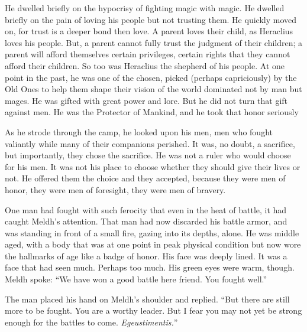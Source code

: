 He dwelled briefly on the hypocrisy of fighting magic with magic. He dwelled briefly on the pain of loving his people but not trusting them. He quickly moved on, for trust is a deeper bond then love. A parent loves their child, as Heraclius loves his people. But, a parent cannot fully trust the judgment of their children; a parent will afford themselves certain privileges, certain rights that they cannot afford their children. So too was Heraclius the shepherd of his people. At one point in the past, he was one of the chosen, picked (perhaps capriciously) by the Old Ones to help them shape their vision of the world dominated not by man but mages. He was gifted with great power and lore. But he did not turn that gift against men. He was the Protector of Mankind, and he took that honor seriously

As he strode through the camp, he looked upon his men, men who fought valiantly while many of their companions perished. It was, no doubt, a sacrifice, but importantly, they chose the sacrifice. He was not a ruler who would choose for his men. It was not his place to choose whether they should give their lives or not. He offered them the choice and they accepted, because they were men of honor, they were men of foresight, they were men of bravery.

One man had fought with such ferocity that even in the heat of battle, it had caught Meldh’s attention. That man had now discarded his battle armor, and was standing in front of a small fire, gazing into its depths, alone. He was middle aged, with a body that was at one point in peak physical condition but now wore the hallmarks of age like a badge of honor. His face was deeply lined. It was a face that had seen much. Perhaps too much. His green eyes were warm, though. Meldh spoke: “We have won a good battle here friend. You fought well.”

The man placed his hand on Meldh’s shoulder and replied. “But there are still more to be fought. You are a worthy leader. But I fear you may not yet be strong enough for the battles to come. \emph{Egeustimentis.}”

 

